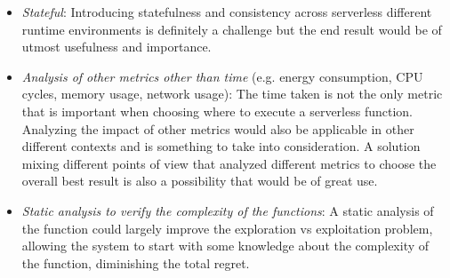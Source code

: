\begin{itemize}
    \item \textit{Stateful}: Introducing statefulness and consistency across serverless
        different runtime environments is definitely a challenge but the end result would be of utmost usefulness and importance.
    \item \textit{Analysis of other metrics other than time} (e.g. energy consumption, CPU
        cycles, memory usage, network usage): The time taken is not the only metric that is important when choosing where to execute a serverless function. Analyzing the impact of other metrics would also be applicable in other different contexts and is something to take into consideration.
        A solution mixing different points of view that analyzed different metrics to choose the overall best result is also a possibility that would be of great use.
    \item \textit{Static analysis to verify the complexity of the functions}: A static analysis
        of the function could largely improve the exploration vs exploitation problem, allowing the system to start with some knowledge about the complexity of the function, diminishing the total regret.
\end{itemize}
